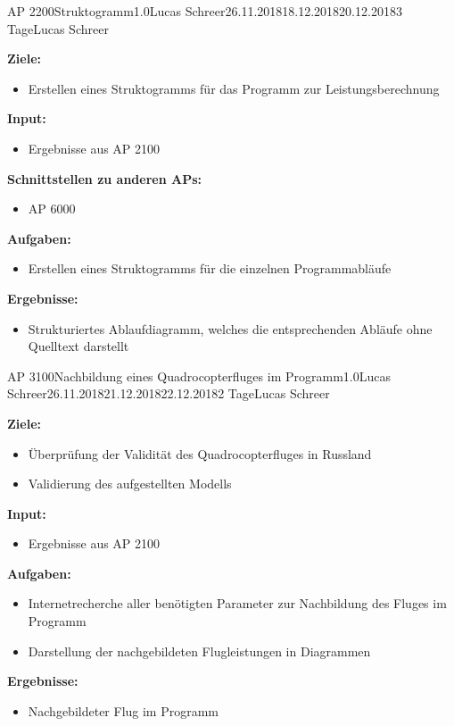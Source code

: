 \clearpage
\begin{wpd}{AP 2200}{Struktogramm}{1.0}{Lucas Schreer}{26.11.2018}{18.12.2018}{20.12.2018}{3 Tage}{Lucas Schreer}
    {
    \textbf{Ziele:}
    \begin{itemize}
        \item Erstellen eines Struktogramms für das Programm zur Leistungsberechnung
    \end{itemize}
    \textbf{Input:}
    \begin{itemize}
        \item Ergebnisse aus AP 2100
    \end{itemize}
    \textbf{Schnittstellen zu anderen APs:}
    \begin{itemize}
        \item AP 6000
    \end{itemize}
    \textbf{Aufgaben:}
    \begin{itemize}
        \item Erstellen eines Struktogramms für die einzelnen Programmabläufe
    \end{itemize}
    \textbf{Ergebnisse:}
    \begin{itemize}
        \item Strukturiertes Ablaufdiagramm, welches die entsprechenden Abläufe ohne Quelltext darstellt
    \end{itemize}
    }
\end{wpd}


\clearpage
\begin{wpd}{AP 3100}{Nachbildung eines Quadrocopterfluges im Programm}{1.0}{Lucas Schreer}{26.11.2018}{21.12.2018}{22.12.2018}{2 Tage}{Lucas Schreer}
    {
    \textbf{Ziele:}
    \begin{itemize}
        \item Überprüfung der Validität des Quadrocopterfluges in Russland
        \item Validierung des aufgestellten Modells
    \end{itemize}
    \textbf{Input:}
    \begin{itemize}
        \item Ergebnisse aus AP 2100
    \end{itemize}
    \textbf{Aufgaben:}
    \begin{itemize}
        \item Internetrecherche aller benötigten Parameter zur Nachbildung des Fluges im Programm
        \item Darstellung der nachgebildeten Flugleistungen in Diagrammen
    \end{itemize}
    \textbf{Ergebnisse:}
    \begin{itemize}
        \item Nachgebildeter Flug im Programm
    \end{itemize}
    }
\end{wpd}

